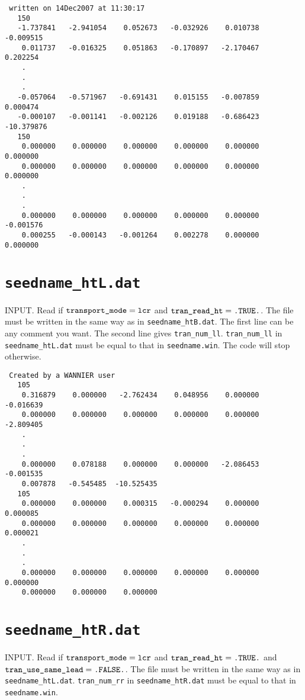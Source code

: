 \begin{verbatim}
 written on 14Dec2007 at 11:30:17
   150
   -1.737841   -2.941054    0.052673   -0.032926    0.010738   -0.009515
    0.011737   -0.016325    0.051863   -0.170897   -2.170467    0.202254
    .
    .
    .
   -0.057064   -0.571967   -0.691431    0.015155   -0.007859    0.000474
   -0.000107   -0.001141   -0.002126    0.019188   -0.686423  -10.379876
   150
    0.000000    0.000000    0.000000    0.000000    0.000000    0.000000
    0.000000    0.000000    0.000000    0.000000    0.000000    0.000000
    .
    .
    .
    0.000000    0.000000    0.000000    0.000000    0.000000   -0.001576
    0.000255   -0.000143   -0.001264    0.002278    0.000000    0.000000
\end{verbatim}

\section{{\tt seedname\_htL.dat}}

INPUT.
Read if $\verb#transport_mode#=\verb#lcr#$
and $\verb#tran_read_ht#=\verb#.TRUE.#$.
The file must be written in the same way as 
in \verb#seedname_htB.dat#.
The first line can be any comment you want.
The second line gives \verb#tran_num_ll#.
\verb#tran_num_ll# in \verb#seedname_htL.dat#
must be equal to
that in \verb#seedname.win#. 
The code will stop otherwise.

\begin{verbatim}
 Created by a WANNIER user
   105
    0.316879    0.000000   -2.762434    0.048956    0.000000   -0.016639
    0.000000    0.000000    0.000000    0.000000    0.000000   -2.809405
    .
    .
    .
    0.000000    0.078188    0.000000    0.000000   -2.086453   -0.001535
    0.007878   -0.545485  -10.525435
   105
    0.000000    0.000000    0.000315   -0.000294    0.000000    0.000085
    0.000000    0.000000    0.000000    0.000000    0.000000    0.000021
    .
    .
    .
    0.000000    0.000000    0.000000    0.000000    0.000000    0.000000
    0.000000    0.000000    0.000000
\end{verbatim}

\section{{\tt seedname\_htR.dat}}

INPUT.
Read if $\verb#transport_mode#=\verb#lcr#$
and $\verb#tran_read_ht#=\verb#.TRUE.#$
and $\verb#tran_use_same_lead#=\verb#.FALSE.#$.
The file must be written in the same way as 
in \verb#seedname_htL.dat#.
\verb#tran_num_rr# in \verb#seedname_htR.dat#
must be equal to
that in \verb#seedname.win#. 


